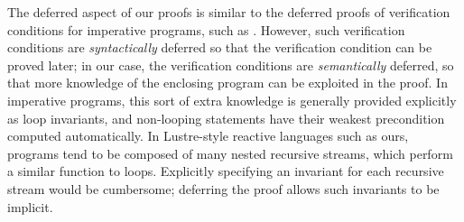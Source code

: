 


The deferred aspect of our proofs is similar to the deferred proofs of verification conditions for imperative programs, such as \cite{oconnor2019deferring}.
However, such verification conditions are \emph{syntactically} deferred so that the verification condition can be proved later; in our case, the verification conditions are \emph{semantically} deferred, so that more knowledge of the enclosing program can be exploited in the proof.
In imperative programs, this sort of extra knowledge is generally provided explicitly as loop invariants, and non-looping statements have their weakest precondition computed automatically.
In Lustre-style reactive languages such as ours, programs tend to be composed of many nested recursive streams, which perform a similar function to loops.
Explicitly specifying an invariant for each recursive stream would be cumbersome; deferring the proof allows such invariants to be implicit.

